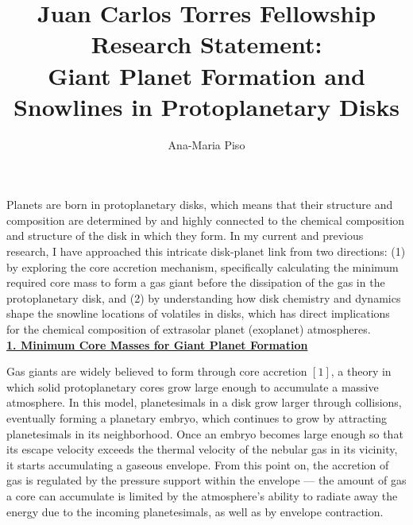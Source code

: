 \documentclass[12pt, letterpaper]{article}
\date{}
\title{\Large Juan Carlos Torres Fellowship Research Statement: \\
Giant Planet Formation and Snowlines in Protoplanetary Disks\vspace{-2ex}}
\author{Ana-Maria Piso \vspace{-2ex}}
\begin{document}
\maketitle


\vspace{-1.5cm}


Planets are born in protoplanetary disks, which means that their structure and composition are determined by and highly connected to the chemical composition and structure of the disk in which they form. In my current and previous research, I have approached this intricate disk-planet link from two directions: (1) by exploring the core accretion mechanism, specifically calculating the minimum required core mass to form a gas giant before the dissipation of the gas in the protoplanetary disk, and (2) by understanding how disk chemistry and dynamics shape the snowline locations of volatiles in disks, which has direct implications for the chemical composition of extrasolar planet (exoplanet) atmospheres. \\
\underline{\textbf{1. Minimum Core Masses for Giant Planet Formation}}

Gas giants are widely believed to form through core accretion $[1]$, a theory in which solid protoplanetary cores grow large enough to accumulate a massive atmosphere. In this model, planetesimals in a disk grow larger through collisions, eventually forming a planetary embryo, which continues to grow by attracting planetesimals in its neighborhood. Once an embryo becomes large enough so that its escape velocity exceeds the thermal velocity of the nebular gas in its vicinity, it starts accumulating a gaseous envelope. From this point on, the accretion of gas is regulated by the pressure support within the envelope --- the amount of gas a core can accumulate is limited by the atmosphere's ability to radiate away the energy due to the incoming planetesimals, as well as by envelope contraction.  
\end{document}
